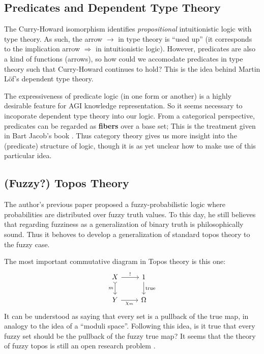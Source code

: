 \documentclass[orivec]{llncs}
\begin{document}
\subsection{Predicates and Dependent Type Theory}

The Curry-Howard isomorphism identifies \textit{propositional} intuitionistic logic with type theory.  As such, the arrow $\rightarrow$ in type theory is ``used up'' (it corresponds to the implication arrow $\Rightarrow$ in intuitionistic logic).  However, predicates are also a kind of functions (arrows), so how could we accomodate predicates in type theory such that Curry-Howard continues to hold?  This is the idea behind Martin L\"{o}f's dependent type theory.

The expressiveness of predicate logic (in one form or another) is a highly desirable feature for AGI knowledge representation.  So it seems necessary to incoporate dependent type theory into our logic.  From a categorical perspective, predicates can be regarded as \textbf{fibers} over a base set;  This is the treatment given in Bart Jacob's book \cite{Jacobs1999}.  Thus category theory gives us more insight into the (predicate) structure of logic, though it is as yet unclear how to make use of this particular idea.
%
%

\subsection{(Fuzzy?) Topos Theory}

The author's previous paper \cite{Yan2012} proposed a fuzzy-probabilistic logic where probabilities are distributed over fuzzy truth values.  To this day, he still believes that regarding fuzziness as a generalization of binary truth is philosophically sound.  Thus it behoves to develop a generalization of standard topos theory to the fuzzy case.  

The most important commutative diagram in Topos theory is this one:
\begin{equation}
\label{eqn:subobject-classifier}
\begin{tikzcd}[column sep = normal]
X \arrow[r, "!"] \arrow[d, tail, swap, "m"] & 1 \arrow[d, "\mathrm{true}"] \\
Y \arrow[r, swap, "\chi_m"] & \Omega
\end{tikzcd}
\end{equation}
It can be understood as saying that every set is a pullback of the true map, in analogy to the idea of a ``moduli space''.  Following this idea, is it true that every fuzzy set should be the pullback of the fuzzy true map?  It seems that the theory of fuzzy topos is still an open research problem \cite{Jardine2019} \cite{Vickers2010}.
\end{document}
